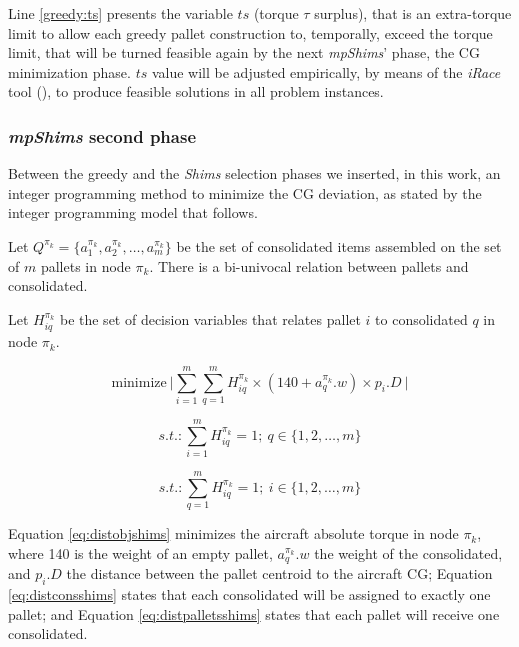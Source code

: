 \documentclass[preprint,authoryear]{elsarticle}
\begin{document}
Line \ref{greedy:ts} presents the variable $ts$ (torque $\tau$ surplus), that is an extra-torque limit to allow each greedy pallet construction to, temporally, exceed the torque limit, that will be turned feasible again by the next {\it mpShims}' phase, the CG minimization phase. $ts$ value will be adjusted empirically, by means of the {\it iRace} tool (\cite{LopezIbanezManuel2016}), to produce feasible solutions in all problem instances.



\subsubsection{{\it mpShims} second phase}
\label{subsection:second_phase}

Between the greedy and the {\it Shims} selection phases we inserted, in this work, an integer programming method to minimize the CG deviation, as stated by the integer programming model that follows.

Let $Q^{\pi_k}  = \{ a^{\pi_k}_1, a^{\pi_k}_2, \ldots, a^{\pi_k}_m \}$ be the set of consolidated items assembled on the set of $m$ pallets in node $\pi_k$. There is a bi-univocal relation between pallets and consolidated.

Let $H^{\pi_k}_{iq}$ be the set of decision variables that relates pallet $i$ to consolidated $q$ in node $\pi_k$.

\begin{equation} \label{eq:distobjshims}
	\mbox{minimize}\ \Bigg |  \sum_{i=1}^{m} \sum_{q=1}^{m} H^{\pi_k}_{iq} \times  (140 + a^{\pi_k}_q.w) \times p_i.D\ \Bigg | 
\end{equation}

\begin{equation} \label{eq:distconsshims}
	s.t.: \sum_{i=1}^{m} H^{\pi_k}_{iq} = 1;\ q \in \{1,2,\ldots,m\}
\end{equation}

\begin{equation} \label{eq:distpalletsshims}
	s.t.: \sum_{q=1}^{m} H^{\pi_k}_{iq}=1;\ i \in \{1,2,\ldots,m\}
\end{equation}

Equation \ref{eq:distobjshims} minimizes the aircraft absolute torque in node $\pi_k$, where 140 is the weight of an empty pallet, $a^{\pi_k}_q.w$ the weight of the consolidated, and $p_i.D$ the distance between the pallet centroid to the aircraft CG; Equation \ref{eq:distconsshims} states that each consolidated will be assigned to exactly one pallet; and Equation \ref{eq:distpalletsshims} states that each pallet will receive one consolidated.
\end{document}
